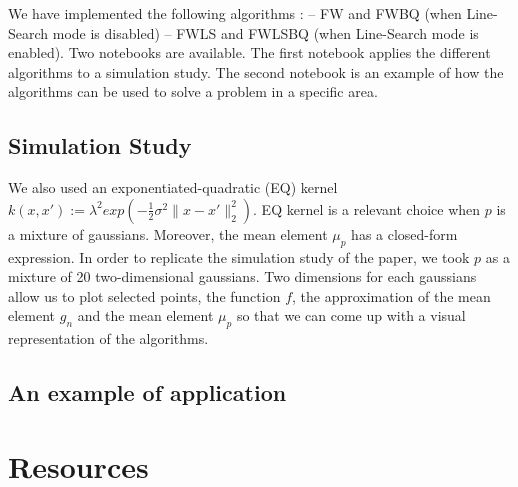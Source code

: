 We have implemented the following algorithms : -- FW and FWBQ (when Line-Search mode is disabled) -- FWLS and FWLSBQ (when Line-Search mode is enabled). Two notebooks are available. The first notebook applies the different algorithms to a simulation study. The second notebook is an example of how the algorithms can be used to solve a problem in a specific area.

\subsection{Simulation Study}

We also used an exponentiated-quadratic (EQ) kernel $k(x, x') := \lambda^{2} exp(-\frac{1}{2}\sigma^{2} \| x-x' \|_{2}^{2} )$. EQ kernel is a relevant choice when $p$ is a mixture of gaussians. Moreover, the mean element $\mu_{p}$ has a closed-form expression.
In order to replicate the simulation study of the paper, we took $p$ as a mixture of 20 two-dimensional gaussians. Two dimensions for each gaussians allow us to plot selected points, the function $f$, the approximation of the mean element $g_n$ and the mean element $\mu_{p}$ so that we can come up with a visual representation of the algorithms.

\subsection{An example of application}


\section*{Resources}
\label{sec:bibli}

\nocite{*}
\printbibliography[heading=none]
